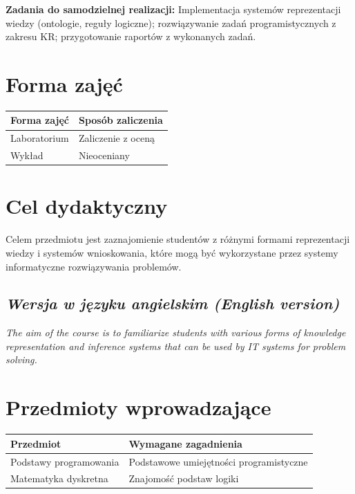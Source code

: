 \documentclass[12pt, a4paper]{article}
\begin{document}
\vspace{4pt}
\noindent\textbf{Zadania do samodzielnej realizacji:} Implementacja systemów reprezentacji wiedzy (ontologie, reguły logiczne); rozwiązywanie zadań programistycznych z zakresu KR; przygotowanie raportów z wykonanych zadań.

\section{Forma zajęć}

\begin{tabular}{ll}
  \hline
  \textbf{Forma zajęć} & \textbf{Sposób zaliczenia} \\
  \hline
  Laboratorium & Zaliczenie z oceną \\
  Wykład & Nieoceniany \\
  \hline
\end{tabular}

\section{Cel dydaktyczny}

Celem przedmiotu jest zaznajomienie studentów z różnymi formami reprezentacji wiedzy i systemów wnioskowania, które mogą być wykorzystane przez systemy informatyczne rozwiązywania problemów.

\subsection*{\textit{Wersja w języku angielskim (English version)}}

\textit{The aim of the course is to familiarize students with various forms of knowledge representation and inference systems that can be used by IT systems for problem solving.}


\section{Przedmioty wprowadzające}

\begin{tabularx}{\textwidth}{lX}
  \hline
  \textbf{Przedmiot} & \textbf{Wymagane zagadnienia} \\
  \hline
  Podstawy programowania & Podstawowe umiejętności programistyczne \\
  Matematyka dyskretna & Znajomość podstaw logiki \\
  \hline
\end{tabularx}
\end{document}
